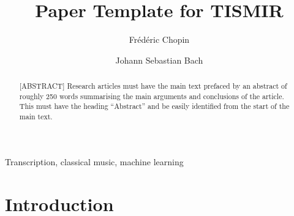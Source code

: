 \documentclass[ProofPDF]{./Styles/Jnls-Template-V3}
\begin{document}
\def\MSFirstPage{\pageref{startPage_Label}}
\def\MSLastPage{\pageref{endPage_Label}}
\graphicspath{{./figures/}}
\label{startPage_Label}
\title{Paper Template for TISMIR}


\author[1]{Frédéric Chopin}
\author[2]{Johann Sebastian Bach}


\begin{history}
\end{history}

\begin{abstract}[ABSTRACT]
Research articles must have the main text prefaced by an abstract of roughly 250 words summarising the main arguments and conclusions of the article.
This must have the heading ``Abstract'' and be easily identified from the start
of the main text.
\end{abstract}

\begin{keyword}[KEYWORDS:]

Transcription, classical music, machine learning

\end{keyword}

\maketitle

\linenumbers

\section{Introduction}\label{sec:intro}
\end{document}
